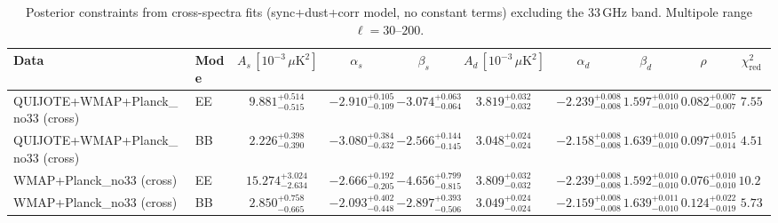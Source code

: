 \begin{table}[h]
\centering
\scriptsize
\setlength{\tabcolsep}{4pt}
\caption{Posterior constraints from cross-spectra fits (sync+dust+corr model, no constant terms) excluding the 33\,GHz band. Multipole range $\ell=30$--$200$.}
\label{tab:fit_results_cross_no33_sync_dust_cross}
\begin{tabular}{llcccccccc}
\toprule
Data & Mode & $A_s\,[10^{-3}\,\mu\mathrm{K}^2]$ & $\alpha_s$ & $\beta_s$ & $A_d\,[10^{-3}\,\mu\mathrm{K}^2]$ & $\alpha_d$ & $\beta_d$ & $\rho$ & $\chi^2_\mathrm{red}$ \\
\midrule
QUIJOTE+WMAP+Planck\_no33 (cross) & EE & $9.881^{+0.514}_{-0.515}$ & $-2.910^{+0.105}_{-0.109}$ & $-3.074^{+0.063}_{-0.064}$ & $3.819^{+0.032}_{-0.032}$ & $-2.239^{+0.008}_{-0.008}$ & $1.597^{+0.010}_{-0.010}$ & $0.082^{+0.007}_{-0.007}$ & $7.55$ \\
QUIJOTE+WMAP+Planck\_no33 (cross) & BB & $2.226^{+0.398}_{-0.390}$ & $-3.080^{+0.384}_{-0.432}$ & $-2.566^{+0.144}_{-0.145}$ & $3.048^{+0.024}_{-0.024}$ & $-2.158^{+0.008}_{-0.008}$ & $1.639^{+0.010}_{-0.010}$ & $0.097^{+0.015}_{-0.014}$ & $4.51$ \\
WMAP+Planck\_no33 (cross) & EE & $15.274^{+3.024}_{-2.634}$ & $-2.666^{+0.192}_{-0.205}$ & $-4.656^{+0.799}_{-0.815}$ & $3.809^{+0.032}_{-0.032}$ & $-2.239^{+0.008}_{-0.008}$ & $1.592^{+0.010}_{-0.010}$ & $0.076^{+0.010}_{-0.010}$ & $10.20$ \\
WMAP+Planck\_no33 (cross) & BB & $2.850^{+0.758}_{-0.665}$ & $-2.093^{+0.402}_{-0.448}$ & $-2.897^{+0.393}_{-0.506}$ & $3.049^{+0.024}_{-0.024}$ & $-2.159^{+0.008}_{-0.008}$ & $1.639^{+0.011}_{-0.010}$ & $0.124^{+0.022}_{-0.019}$ & $5.73$ \\
\bottomrule
\end{tabular}
\end{table}
